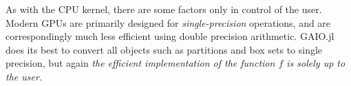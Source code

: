 As with the CPU kernel, there are some factors only in control of the user. Modern GPUs 
are primarily designed for \emph{single-precision} operations, and are correspondingly 
much less efficient using double precision arithmetic. GAIO.jl does its best to convert 
all objects such as partitions and box sets to single precision, but again \emph{
the efficient implementation of the function $f$ is solely up to the user.
}

